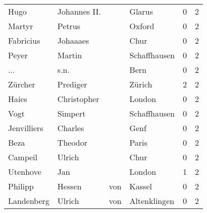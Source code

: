 \begin{center}
\begin{tiny}
\begin{longtabu}{llllrr}
                     Hugo &                       Johannes II. &             &                                      Glarus &          0 &         2 \\
                   Martyr &                             Petrus &             &                                      Oxford &          0 &         2 \\
                Fabricius &                           Johaaaes &             &                                        Chur &          0 &         2 \\
                    Peyer &                             Martin &             &                                Schaffhausen &          0 &         2 \\
                      ... &                               s.n. &             &                                        Bern &          0 &         2 \\
                  Zürcher &                           Prediger &             &                                      Zürich &          2 &         2 \\
                    Haies &                        Christopher &             &                                      London &          0 &         2 \\
                     Vogt &                            Simpert &             &                                Schaffhausen &          0 &         2 \\
              Jenvilliers &                            Charles &             &                                        Genf &          0 &         2 \\
                     Beza &                            Theodor &             &                                       Paris &          0 &         2 \\
                  Campeil &                             Ulrich &             &                                        Chur &          0 &         2 \\
                 Utenhove &                                Jan &             &                                      London &          1 &         2 \\
                  Philipp &                             Hessen &         von &                                      Kassel &          0 &         2 \\
               Landenberg &                             Ulrich &         von &                                Altenklingen &          0 &         2 \\

\end{longtabu}
\end{tiny}
\end{center}
